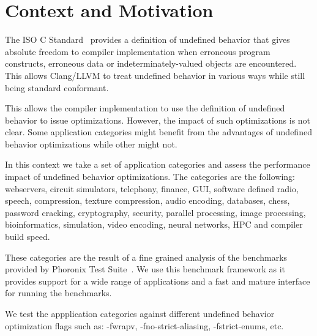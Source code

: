 \section{Context and Motivation}

The ISO C Standard~\cite{iso90} provides a definition of undefined
behavior that gives absolute freedom to compiler implementation when
erroneous program constructs, erroneous data or indeterminately-valued
objects are encountered. This allows Clang/LLVM to treat
undefined behavior in various ways while still being standard
conformant.

This allows the compiler implementation to use the definition of
undefined behavior to issue optimizations. However, the impact of such
optimizations is not clear. Some application categories might benefit
from the advantages of undefined behavior optimizations while other
might not.

In this context we take a set of application categories and assess the
performance impact of undefined behavior optimizations. The categories
are the following: webservers, circuit simulators, telephony, finance,
GUI, software defined radio, speech, compression, texture compression,
audio encoding, databases, chess, password cracking, cryptography,
security, parallel processing, image processing, bioinformatics,
simulation, video encoding, neural networks, HPC and compiler build
speed.

These categories are the result of a fine grained analysis of the
benchmarks provided by Phoronix Test Suite~\cite{pts}. We use this
benchmark framework as it provides support for a wide range of
applications and a fast and mature interface for running the benchmarks.

We test the appplication categories against different undefined behavior
optimization flags such as: -fwrapv, -fno-strict-aliasing,
-fstrict-enums, etc.
